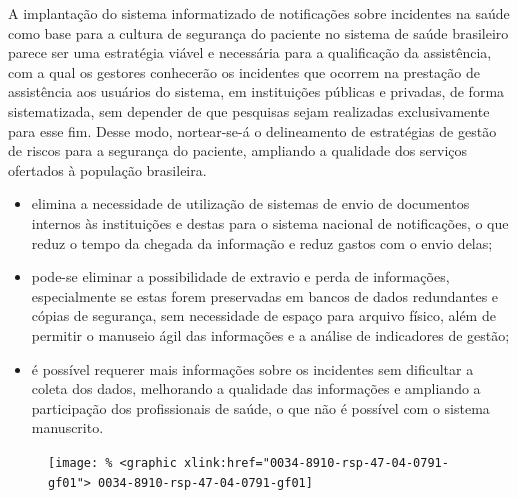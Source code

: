 \documentclass{article}
\begin{document}
A implantação do sistema informatizado de notificações sobre incidentes na saúde como base
        para a cultura de segurança do paciente no sistema de saúde brasileiro parece ser uma
        estratégia viável e necessária para a qualificação da assistência, com a qual os gestores
        conhecerão os incidentes que ocorrem na prestação de assistência aos usuários do sistema, em
        instituições públicas e privadas, de forma sistematizada, sem depender de que pesquisas
        sejam realizadas exclusivamente para esse fim. Desse modo, nortear-se-á o delineamento de
        estratégias de gestão de riscos para a segurança do paciente, ampliando a qualidade dos
        serviços ofertados à população brasileira.

\begin{itemize}
\item %

elimina a necessidade de utilização de sistemas de envio de documentos internos às
            instituições e destas para o sistema nacional de notificações, o que reduz o tempo da
            chegada da informação e reduz gastos com o envio delas;

\item %

pode-se eliminar a possibilidade de extravio e perda de informações, especialmente se
            estas forem preservadas em bancos de dados redundantes e cópias de segurança, sem
            necessidade de espaço para arquivo físico, além de permitir o manuseio ágil das
            informações e a análise de indicadores de gestão;

\item %

é possível requerer mais informações sobre os incidentes sem dificultar a coleta dos
            dados, melhorando a qualidade das informações e ampliando a participação dos
            profissionais de saúde, o que não é possível com o sistema manuscrito.

 \end{itemize}

\begin{figure}
\texttt{[image: \% <graphic xlink:href="0034-8910-rsp-47-04-0791-gf01">
0034-8910-rsp-47-04-0791-gf01]}
\caption{}\label{fig:f01}
\end{figure}
\end{document}
